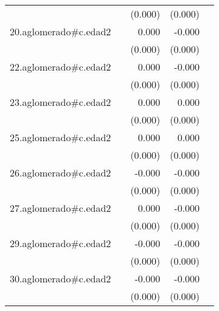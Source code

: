 {\begin{longtable}{l*{4}{D{.}{.}{-1}}}
            &                     &     (0.000)         &     (0.000)         &                     \\
\addlinespace
20.aglomerado#c.edad2&                     &       0.000         &      -0.000         &                     \\
            &                     &     (0.000)         &     (0.000)         &                     \\
\addlinespace
22.aglomerado#c.edad2&                     &       0.000         &      -0.000         &                     \\
            &                     &     (0.000)         &     (0.000)         &                     \\
\addlinespace
23.aglomerado#c.edad2&                     &       0.000\sym{*}  &       0.000         &                     \\
            &                     &     (0.000)         &     (0.000)         &                     \\
\addlinespace
25.aglomerado#c.edad2&                     &       0.000         &       0.000         &                     \\
            &                     &     (0.000)         &     (0.000)         &                     \\
\addlinespace
26.aglomerado#c.edad2&                     &      -0.000         &      -0.000\sym{*}  &                     \\
            &                     &     (0.000)         &     (0.000)         &                     \\
\addlinespace
27.aglomerado#c.edad2&                     &       0.000         &      -0.000         &                     \\
            &                     &     (0.000)         &     (0.000)         &                     \\
\addlinespace
29.aglomerado#c.edad2&                     &      -0.000         &      -0.000         &                     \\
            &                     &     (0.000)         &     (0.000)         &                     \\
\addlinespace
30.aglomerado#c.edad2&                     &      -0.000         &      -0.000\sym{**} &                     \\
            &                     &     (0.000)         &     (0.000)         &                     \\

\end{longtable}}
